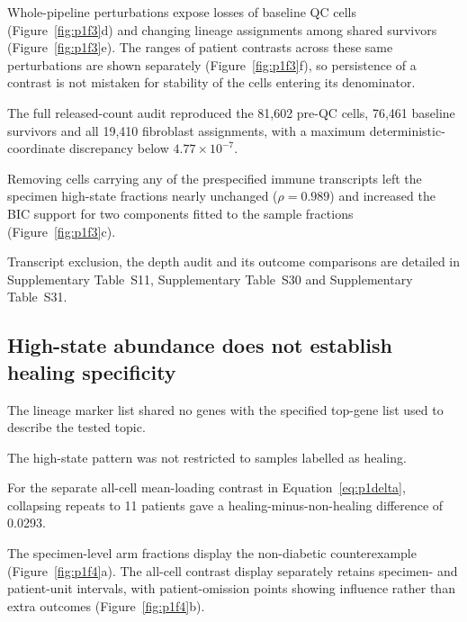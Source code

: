 \documentclass[10pt,a4paper]{article}
\begin{document}
Whole-pipeline perturbations expose losses of baseline QC cells (Figure~\ref{fig:p1f3}d) and changing lineage assignments among shared survivors (Figure~\ref{fig:p1f3}e). The ranges of patient contrasts across these same perturbations are shown separately (Figure~\ref{fig:p1f3}f), so persistence of a contrast is not mistaken for stability of the cells entering its denominator.

The full released-count audit reproduced the 81,602 pre-QC cells, 76,461 baseline survivors and all 19,410 fibroblast assignments, with a maximum deterministic-coordinate discrepancy below $4.77\times10^{-7}$.

Removing cells carrying any of the prespecified immune transcripts left the specimen high-state fractions nearly unchanged ($\rho=0.989$) and increased the BIC support for two components fitted to the sample fractions (Figure~\ref{fig:p1f3}c).

Transcript exclusion, the depth audit and its outcome comparisons are detailed in Supplementary Table~S11, Supplementary Table~S30 and Supplementary Table~S31.

\subsection{High-state abundance does not establish healing specificity}

The lineage marker list shared no genes with the specified top-gene list used to describe the tested topic.

The high-state pattern was not restricted to samples labelled as healing.

For the separate all-cell mean-loading contrast in Equation~\eqref{eq:p1delta}, collapsing repeats to 11 patients gave a healing-minus-non-healing difference of 0.0293.

The specimen-level arm fractions display the non-diabetic counterexample (Figure~\ref{fig:p1f4}a\label{call:p1f4}). The all-cell contrast display separately retains specimen- and patient-unit intervals, with patient-omission points showing influence rather than extra outcomes (Figure~\ref{fig:p1f4}b).
\end{document}
